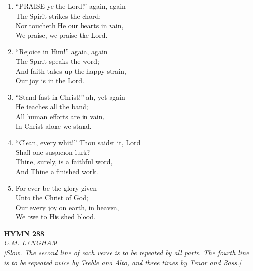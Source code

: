 \begin{enumerate}
    \item ``PRAISE ye the Lord!'' again, again \\
        The Spirit strikes the chord; \\
        Nor toucheth He our hearts in vain, \\
        We praise, we praise the Lord.

    \item ``Rejoice in Him!'' again, again \\
        The Spirit speaks the word; \\
        And faith takes up the happy strain, \\
        Our joy is in the Lord.

    \item ``Stand fast in Christ!'' ah, yet again \\
        He teaches all the band; \\
        All human efforts are in vain, \\
        In Christ alone we stand.

    \item ``Clean, every whit!'' Thou saidst it, Lord \\
        Shall one suspicion lurk? \\
        Thine, surely, is a faithful word, \\
        And Thine a finished work.

    \item For ever be the glory given \\
        Unto the Christ of God; \\
        Our every joy on earth, in heaven, \\
        We owe to His shed blood.

\end{enumerate}

\newpage
\begin{center}
    {\Large \textbf{HYMN 288}}
    \\
    \textit{C.M. LYNGHAM}
    \\
    \textit{\small [Slow. The second line of each verse is to be repeated by all parts. The fourth line is to be repeated twice by Treble and Alto, and three times by Tenor and Bass.]}
\end{center}
\vspace{1em}

